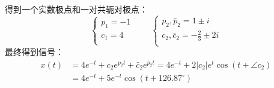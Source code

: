 得到一个实数极点和一对共轭对极点：
\[
\begin{cases}
	p_1=-1\\
	c_1=4\\
\end{cases} \qquad \begin{cases}
	p_2,\bar{p}_2=1\pm i\\
	c_2,\bar{c}_2=-\frac{2}{3}\pm 2i\\
\end{cases}
\]
最终得到信号：
\begin{align*}
x\left( t \right) &=4e^{-t}+c_2e^{p_2t}+\bar{c}_2e^{\bar{p}_2t}=4e^{-t}+2\left| c_2 \right|e^t\cos \left( t+\angle c_2 \right) \\
&=4e^{-t}+5e^{-t}\cos \left( t+126.87^{\circ} \right)
\end{align*}




